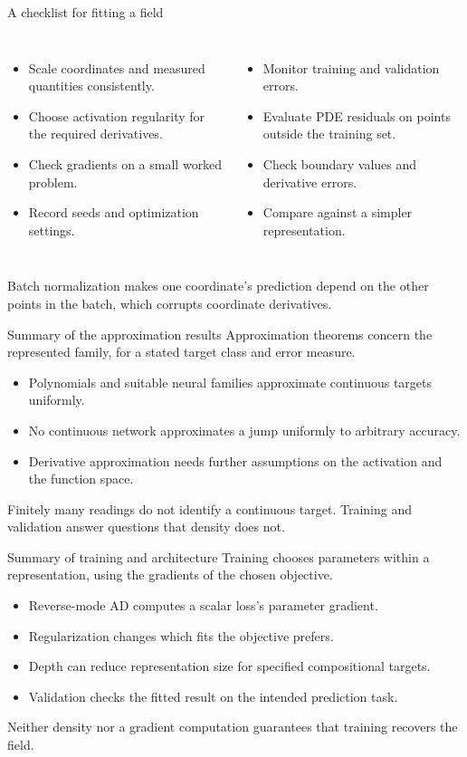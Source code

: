 \documentclass[aspectratio=169]{beamer}
\begin{document}
\begin{frame}{A checklist for fitting a field}
\begin{columns}[T]
\begin{itemize}
\item Scale coordinates and measured quantities consistently.
\item Choose activation regularity for the required derivatives.
\item Check gradients on a small worked problem.
\item Record seeds and optimization settings.
\end{itemize}
\begin{itemize}
\item Monitor training and validation errors.
\item Evaluate PDE residuals on points outside the training set.
\item Check boundary values and derivative errors.
\item Compare against a simpler representation.
\end{itemize}
\end{columns}
\medskip
Batch normalization makes one coordinate's prediction depend on the other points in the batch, which corrupts coordinate derivatives.
\end{frame}

\begin{frame}{Summary of the approximation results}
Approximation theorems concern the represented family, for a stated target class and error measure.
\begin{itemize}
\item Polynomials and suitable neural families approximate continuous targets uniformly.
\item No continuous network approximates a jump uniformly to arbitrary accuracy.
\item Derivative approximation needs further assumptions on the activation and the function space.
\end{itemize}
Finitely many readings do not identify a continuous target.
Training and validation answer questions that density does not.
\end{frame}

\begin{frame}{Summary of training and architecture}
Training chooses parameters within a representation, using the gradients of the chosen objective.
\begin{itemize}
\item Reverse-mode AD computes a scalar loss's parameter gradient.
\item Regularization changes which fits the objective prefers.
\item Depth can reduce representation size for specified compositional targets.
\item Validation checks the fitted result on the intended prediction task.
\end{itemize}
Neither density nor a gradient computation guarantees that training recovers the field.
\end{frame}
\end{document}
